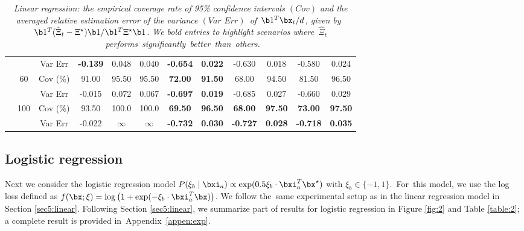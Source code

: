 \begin{table}[!t]
{\begin{tabular}{|c|c|c|c|cccccccc|}
&   &  Var Err &  \textbf{-0.139} &  0.048 &  \multicolumn{1}{c|}{0.040} & \textbf{ -0.654} &  \multicolumn{1}{c|}{\textbf{0.022}} &  -0.630 &  \multicolumn{1}{c|}{0.018} &  -0.580 &  0.024 \\ \cline{2-12} 
&  \multirow{2}{*}{60} &  Cov (\%) &  91.00 &  95.50 &  \multicolumn{1}{c|}{95.50} &  \textbf{72.00} &  \multicolumn{1}{c|}{\textbf{91.50}} &  68.00 &  \multicolumn{1}{c|}{94.50} &  81.50 &  96.50 \\
&   &  Var Err &  -0.015 &  0.072 &  \multicolumn{1}{c|}{0.067} &  \textbf{-0.697} &  \multicolumn{1}{c|}{\textbf{0.019}} &  -0.685 &  \multicolumn{1}{c|}{0.027} &  -0.660 &  0.029 \\ \cline{2-12} 
&  \multirow{2}{*}{100} &  Cov (\%) &  93.50 &  100.0 &  \multicolumn{1}{c|}{100.0} &  \textbf{69.50} &  \multicolumn{1}{c|}{\textbf{96.50}} &  \textbf{68.00} &  \multicolumn{1}{c|}{\textbf{97.50}} &  \textbf{73.00} &  \textbf{97.50} \\
&   &  Var Err &  -0.022 &  $\infty$ &  \multicolumn{1}{c|}{$\infty$} &  \textbf{-0.732} &  \multicolumn{1}{c|}{\textbf{0.030}} &  \textbf{-0.727} &  \multicolumn{1}{c|}{\textbf{0.028}} &  \textbf{-0.718} &
\textbf{0.035} \\ \hline
\end{tabular}}
\caption{\textit{Linear regression: the empirical coverage rate of 95\% confidence intervals $(\textit{Cov})$ and the averaged relative estimation error of the variance $(\textit{Var Err})$~of~$\b1^T\bx_t/d$, given by~\mbox{$\b1^T(\hat{\Xi}_t-\Xi^\star)\b1/\b1^T\Xi^\star\b1$}.
We bold entries to highlight scenarios where~$\hat{\Xi}_t$~\mbox{performs}~\mbox{significantly}~\mbox{better}~than~others.}}
\label{table:1}
\end{table}


\subsection{Logistic regression}\label{sec5:logistic}

Next we consider the logistic regression model $P(\xi_{b}\mid\bxi_{a})\propto \exp(0.5\xi_{b}\cdot\bxi_{a}^T\bx^{\star})$ with $\xi_{b}\in\{-1,1\}$.~For~this model, we use the log loss defined as $f(\bx; \xi)=\log\big(1+\exp(-\xi_{b}\cdot\bxi_{a}^T\bx)\big)$. 
We follow the~same experimental setup as in the linear regression model in Section \ref{sec5:linear}. Following Section \ref{sec5:linear}, we summarize part of results for logistic regression in Figure \ref{fig:2} and Table \ref{table:2}; a complete result is provided in~Appendix~\ref{appen:exp}.


